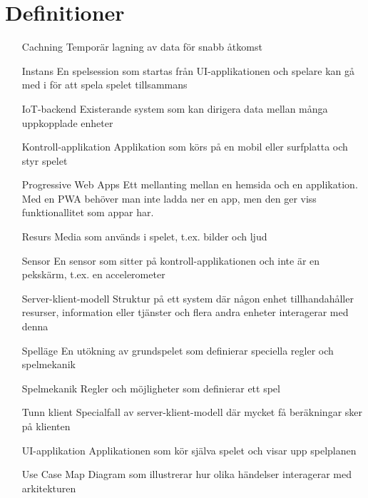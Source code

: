 \section{Definitioner}
\begin{itemize}[leftmargin=3cm]
  \item [Cachning] Temporär lagning av data för snabb åtkomst
  \item [Instans] En spelsession som startas från UI-applikationen och spelare kan gå med i för att spela spelet tillsammans
  \item [IoT-backend] Existerande system som kan dirigera data mellan många uppkopplade enheter
  \item [Kontroll-applikation] Applikation som körs på en mobil eller surfplatta och styr spelet
  \item [Progressive Web Apps] Ett mellanting mellan en hemsida och en applikation. Med en PWA behöver man inte ladda ner en app, men den ger viss funktionallitet som appar har. \cite{bib-pwa}
  \item [Resurs] Media som används i spelet, t.ex. bilder och ljud
  \item [Sensor] En sensor som sitter på kontroll-applikationen och inte är en pekskärm, t.ex. en accelerometer
  \item [Server-klient-modell] Struktur på ett system där någon enhet tillhandahåller resurser, information eller tjänster och flera andra enheter interagerar med denna
  \item [Spelläge] En utökning av grundspelet som definierar speciella regler och spelmekanik
  \item [Spelmekanik] Regler och möjligheter som definierar ett spel
  \item [Tunn klient] Specialfall av server-klient-modell där mycket få beräkningar sker på klienten
  \item [UI-applikation] Applikationen som kör själva spelet och visar upp spelplanen
  \item [Use Case Map] Diagram som illustrerar hur olika händelser interagerar med arkitekturen \cite[p.~30--33]{bib-architecture-primer}
\end{itemize}
